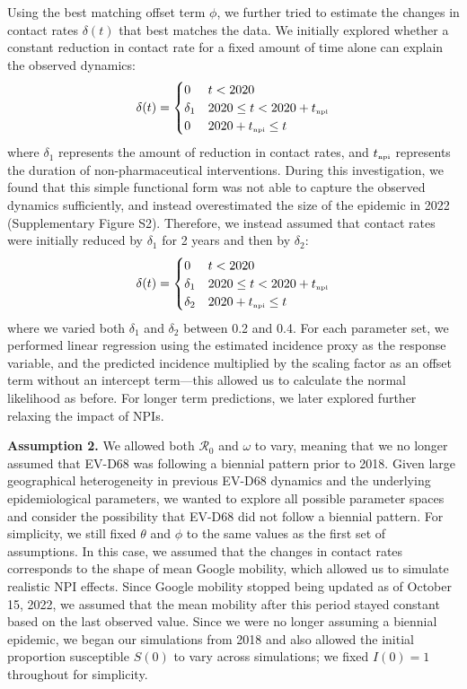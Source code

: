 \documentclass[12pt]{article}
\newcommand{\tsub}[2]{#1_{{\textrm{\tiny #2}}}}
\begin{document}
Using the best matching offset term $\phi$, we further tried to estimate the changes in contact rates $\delta(t)$ that best matches the data.
We initially explored whether a constant reduction in contact rate for a fixed amount of time alone can explain the observed dynamics:
\begin{equation}
\delta(t) = \begin{cases}
0 & t < 2020\\
\delta_1 & 2020 \leq t < 2020 + \tsub{t}{npi} \\
0 & 2020 + \tsub{t}{npi} \leq t
\end{cases}
\end{equation}
where $\delta_1$ represents the amount of reduction in contact rates, and $\tsub{t}{npi}$ represents the duration of non-pharmaceutical interventions.
During this investigation, we found that this simple functional form was not able to capture the observed dynamics sufficiently, and instead overestimated the size of the epidemic in 2022 (Supplementary Figure S2).
Therefore, we instead assumed that contact rates were initially reduced by $\delta_1$ for 2 years and then by $\delta_2$:
\begin{equation}
\delta(t) = \begin{cases}
0 & t < 2020\\
\delta_1 & 2020 \leq t < 2020 + \tsub{t}{npi} \\
\delta_2 & 2020 + \tsub{t}{npi} \leq t
\end{cases}
\end{equation}
where we varied both $\delta_1$ and $\delta_2$ between 0.2 and 0.4.
For each parameter set, we performed linear regression using the estimated incidence proxy as the response variable, and the predicted incidence multiplied by the scaling factor as an offset term without an intercept term---this allowed us to calculate the normal likelihood as before.
For longer term predictions, we later explored further relaxing the impact of NPIs.

\textbf{Assumption 2. } We allowed both $\mathcal R_0$ and $\omega$ to vary, meaning that we no longer assumed that EV-D68 was following a biennial pattern prior to 2018.
Given large geographical heterogeneity in previous EV-D68 dynamics and the underlying epidemiological parameters, we wanted to explore all possible parameter spaces and consider the possibility that EV-D68 did not follow a biennial pattern.
For simplicity, we still fixed $\theta$ and $\phi$ to the same values as the first set of assumptions.
In this case, we assumed that the changes in contact rates corresponds to the shape of mean Google mobility, which allowed us to simulate realistic NPI effects.
Since Google mobility stopped being updated as of October 15, 2022, we assumed that the mean mobility after this period stayed constant based on the last observed value.
Since we were no longer assuming a biennial epidemic, we began our simulations from 2018 and also allowed the initial proportion susceptible $S(0)$ to vary across simulations; we fixed $I(0) = 1$ throughout for simplicity.
\end{document}
